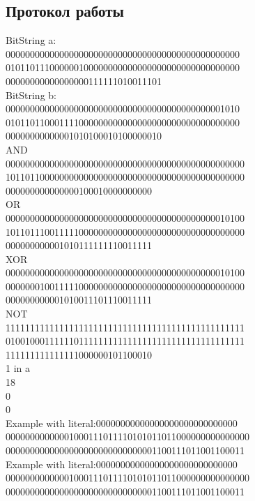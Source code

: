 \documentclass[12pt]{article}
\begin{document}
\subsection*{Протокол работы}
BitString a: \\
000000000000000000000000000000000000000000000000 \\
010110111000000100000000000000000000000000000000 \\
00000000000000000111111010011101 \\
BitString b: \\
000000000000000000000000000000000000000000001010 \\
010110110001111000000000000000000000000000000000 \\
00000000000001010100010100000010 \\
AND \\
0000000000000000000000000000000000000000000000000 \\
1011011000000000000000000000000000000000000000000 \\
000000000000000100010000000000 \\
OR \\
0000000000000000000000000000000000000000000010100 \\
1011011100111110000000000000000000000000000000000 \\
000000000001010111111110011111 \\
XOR \\
0000000000000000000000000000000000000000000010100 \\
0000000100111110000000000000000000000000000000000 \\
000000000001010011101110011111 \\
NOT \\
1111111111111111111111111111111111111111111111111 \\
0100100011111101111111111111111111111111111111111 \\
111111111111111000000101100010 \\
1 in a \\
18 \\
0 \\
0 \\
Example with literal:00000000000000000000000000000 \\
00000000000001000111011110101011011000000000000000 \\
0000000000000000000000000000001100111011001100011 \\
Example with literal:00000000000000000000000000000 \\
00000000000001000111011110101011011000000000000000 \\
0000000000000000000000000000001100111011001100011 \\
\end{document}
